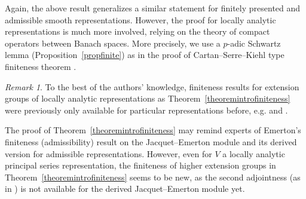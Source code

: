 \documentclass[a4paper,10pt]{amsart}
\theoremstyle{remark}
\newtheorem{remark}[theorem]{Remark}
\theoremstyle{definition}
\theoremstyle{plain}
\numberwithin{equation}{section}
\begin{document}
Again, the above result generalizes a similar statement for finitely presented and admissible smooth representations. However, the proof for locally analytic representations is much more involved, relying on the theory of compact operators between Banach spaces. More precisely, we use a $p$-adic Schwartz lemma (Proposition~\ref{propfinite}) as in the proof of Cartan--Serre--Kiehl type finiteness theorem \cite{kiehl1967endlichkeitssatz}.
\begin{remark}
	To the best of the authors' knowledge, finiteness results for extension groups of locally analytic representations as Theorem~\ref{theoremintrofiniteness} were previously only available for particular representations before, e.g. \cite{ding2022Ext1} and \cite[Thm.~1.3.3]{breuilQian2026}. 

	The proof of Theorem~\ref{theoremintrofiniteness} may remind experts of Emerton's finiteness (admissibility) result on the Jacquet--Emerton module \cite{emerton2006jacquet} and its derived version \cite{lee2025derivedjacquetemerton} for admissible representations. However, even for $V$ a locally analytic principal series representation, the finiteness of higher extension groups in Theorem~\ref{theoremintrofiniteness} seems to be new, as the second adjointness (as in \cite[Prop.~4.2]{breuil2015vers}) is not available for the derived Jacquet--Emerton module yet.
\end{remark}
\end{document}
